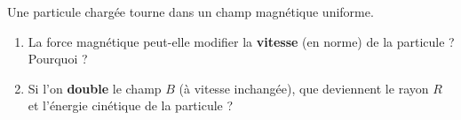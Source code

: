 \documentclass[11pt,a4paper]{article}
\begin{document}
\begin{exo}
Une particule chargée tourne dans un champ magnétique uniforme.
\begin{enumerate}[label=\alph*)]
  \item La force magnétique peut-elle modifier la \textbf{vitesse} (en norme) de la particule ? Pourquoi ?
  \item Si l'on \textbf{double} le champ $B$ (à vitesse inchangée), que deviennent le rayon $R$ et
        l'énergie cinétique de la particule ?
\end{enumerate}
\end{exo}
\end{document}
